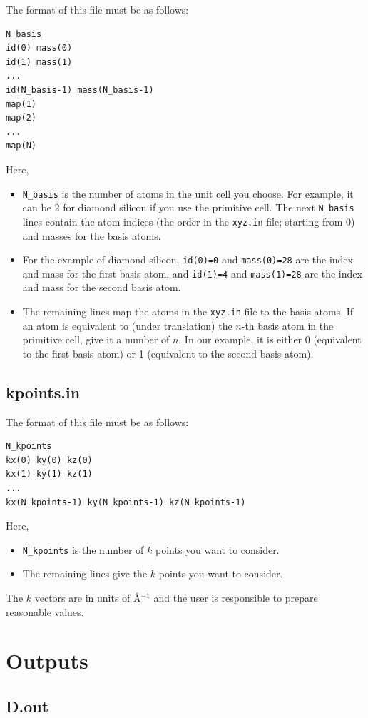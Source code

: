 \documentclass[12pt,a4paper]{report}
\begin{document}
The format of this file must be as follows:
\begin{verbatim}
N_basis
id(0) mass(0)
id(1) mass(1)
...
id(N_basis-1) mass(N_basis-1)
map(1)
map(2)
...
map(N)
\end{verbatim}
Here,
\begin{itemize}
\item \verb"N_basis" is the number of atoms in the unit cell you choose. For example, it can be 2 for diamond silicon if you use the primitive cell. The next \verb"N_basis" lines contain the atom indices (the order in the \verb"xyz.in" file; starting from 0) and masses for the basis atoms.
\item For the example of diamond silicon, \verb"id(0)=0" and \verb"mass(0)=28" are the index and mass for the first basis atom, and \verb"id(1)=4" and \verb"mass(1)=28" are the index and mass for the second basis atom. 
\item The remaining lines map the atoms in the \verb"xyz.in" file to the basis atoms. If an atom is equivalent to (under translation) the $n$-th basis atom in the primitive cell, give it a number of $n$. In our example, it is either 0 (equivalent to the first basis atom) or 1 (equivalent to the second basis atom).
\end{itemize}

\subsection{kpoints.in}
The format of this file must be as follows:
\begin{verbatim}
N_kpoints
kx(0) ky(0) kz(0)
kx(1) ky(1) kz(1)
...
kx(N_kpoints-1) ky(N_kpoints-1) kz(N_kpoints-1)
\end{verbatim}
Here,
\begin{itemize}
\item \verb"N_kpoints" is the number of $k$ points you want to consider. 
\item The remaining lines give the $k$ points you want to consider.
\end{itemize}
The $k$ vectors are in units of \AA$^{-1}$ and the user is responsible to prepare reasonable values.

\section{Outputs}

\subsection{D.out}
\end{document}
